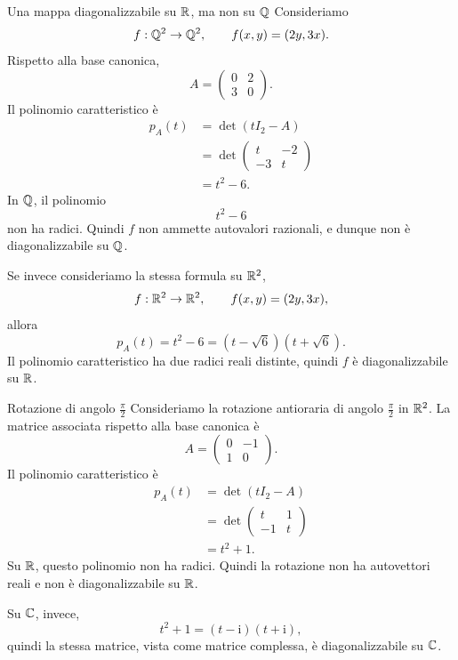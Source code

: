 \documentclass[a4paper]{article}
\begin{document}
\begin{snippetexample}{Una mappa diagonalizzabile su \(\mathbb{R}\), ma non su \(\mathbb{Q}\)}
    Consideriamo
    \[
        f:\mathbb{Q}^2\to\mathbb{Q}^2,
        \qquad
        f(x,y)=(2y,3x).
    \]
    Rispetto alla base canonica,
    \[
        A=
        \begin{pmatrix}
            0 & 2\\
            3 & 0
        \end{pmatrix}.
    \]
    Il polinomio caratteristico è
    \begin{align*}
        p_A(t)
        &=
        \det(tI_2-A)\\
        &=
        \det
        \begin{pmatrix}
            t & -2\\
            -3 & t
        \end{pmatrix}\\
        &=
        t^2-6.
    \end{align*}
    In \(\mathbb{Q}\), il polinomio
    \[
        t^2-6
    \]
    non ha radici. Quindi \(f\) non ammette autovalori razionali, e dunque non è diagonalizzabile su \(\mathbb{Q}\).

    Se invece consideriamo la stessa formula su \(\mathbb{R}^2\),
    \[
        f:\mathbb{R}^2\to\mathbb{R}^2,
        \qquad
        f(x,y)=(2y,3x),
    \]
    allora
    \[
        p_A(t)=t^2-6=(t-\sqrt{6})(t+\sqrt{6}).
    \]
    Il polinomio caratteristico ha due radici reali distinte, quindi \(f\) è diagonalizzabile su \(\mathbb{R}\).
\end{snippetexample}

\begin{snippetexample}{Rotazione di angolo \(\frac{\pi}{2}\)}
    Consideriamo la rotazione antioraria di angolo \(\frac{\pi}{2}\) in \(\mathbb{R}^2\). La matrice associata rispetto alla base canonica è
    \[
        A=
        \begin{pmatrix}
            0 & -1\\
            1 & 0
        \end{pmatrix}.
    \]
    Il polinomio caratteristico è
    \begin{align*}
        p_A(t)
        &=
        \det(tI_2-A)\\
        &=
        \det
        \begin{pmatrix}
            t & 1\\
            -1 & t
        \end{pmatrix}\\
        &=
        t^2+1.
    \end{align*}
    Su \(\mathbb{R}\), questo polinomio non ha radici. Quindi la rotazione non ha autovettori reali e non è diagonalizzabile su \(\mathbb{R}\).

    Su \(\mathbb{C}\), invece,
    \[
        t^2+1=(t-\mathrm{i})(t+\mathrm{i}),
    \]
    quindi la stessa matrice, vista come matrice complessa, è diagonalizzabile su \(\mathbb{C}\).
\end{snippetexample}
\end{document}
